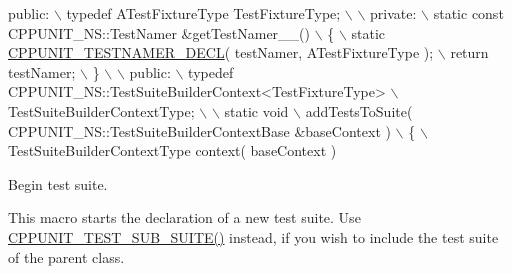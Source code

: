\begin{DoxyCode}
\textcolor{keyword}{public}:                                                                   \(\backslash\)
    typedef ATestFixtureType TestFixtureType;                               \(\backslash\)
                                                                            \(\backslash\)
  private:                                                                  \(\backslash\)
    static \textcolor{keyword}{const} CPPUNIT\_NS::TestNamer &getTestNamer\_\_()                    \(\backslash\)
    \{                                                                       \(\backslash\)
      static \hyperlink{_test_namer_8h_a34ecf6f08dc46e7c3615355be4330414}{CPPUNIT\_TESTNAMER\_DECL}( testNamer, ATestFixtureType );         \(\backslash\)
      return testNamer;                                                     \(\backslash\)
    \}                                                                       \(\backslash\)
                                                                            \(\backslash\)
  public:                                                                   \(\backslash\)
    typedef CPPUNIT\_NS::TestSuiteBuilderContext<TestFixtureType>            \(\backslash\)
                TestSuiteBuilderContextType;                                \(\backslash\)
                                                                            \(\backslash\)
    static void                                                             \(\backslash\)
    addTestsToSuite( CPPUNIT\_NS::TestSuiteBuilderContextBase &baseContext ) \(\backslash\)
    \{                                                                       \(\backslash\)
      TestSuiteBuilderContextType context( baseContext )
\end{DoxyCode}


Begin test suite. 

This macro starts the declaration of a new test suite. Use \hyperlink{group___writing_test_fixture_gae19f30ade82172cf6c3ff297367a10c2}{C\-P\-P\-U\-N\-I\-T\-\_\-\-T\-E\-S\-T\-\_\-\-S\-U\-B\-\_\-\-S\-U\-I\-T\-E()} instead, if you wish to include the test suite of the parent class.


